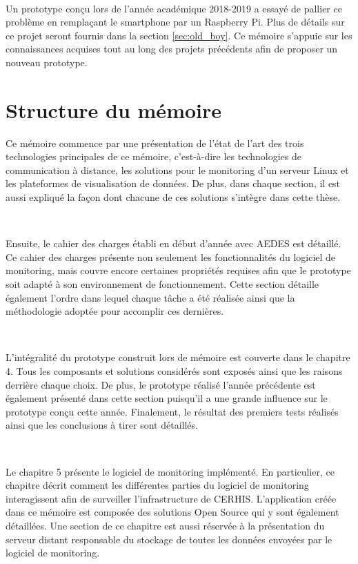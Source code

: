 ~

\noindent
Un prototype conçu lors de l'année académique 2018-2019 a essayé de pallier ce problème en remplaçant le smartphone par un Raspberry Pi. Plus de détails sur ce projet seront fournis dans la section \ref{sec:old_boy}. Ce mémoire s'appuie sur les connaissances acquises tout au long des projets précédents afin de proposer un nouveau prototype.


\section{Structure du mémoire}

\noindent
Ce mémoire commence par une présentation de l’état de l’art des trois technologies principales de ce mémoire, c’est-à-dire les technologies de communication à distance, les solutions pour le monitoring d’un serveur Linux et les plateformes de visualisation de données. De plus, dans chaque section, il est aussi expliqué la façon dont chacune de ces solutions s'intègre dans cette thèse.

~

\noindent
Ensuite, le cahier des charges établi en début d’année avec AEDES est détaillé. Ce cahier des charges présente non seulement les fonctionnalités du logiciel de monitoring, mais couvre encore certaines propriétés requises afin que le prototype soit adapté à son environnement de fonctionnement. Cette section détaille également l’ordre dans lequel chaque tâche a été réalisée ainsi que la méthodologie adoptée pour accomplir ces dernières.

~

\noindent
L’intégralité du prototype construit lors de mémoire est couverte dans le chapitre 4. Tous les composants et solutions considérés sont exposés ainsi que les raisons derrière chaque choix.  De plus, le prototype réalisé l’année précédente est également présenté dans cette section puisqu’il a une grande influence sur le prototype conçu cette année. Finalement, le résultat des premiers tests réalisés ainsi que les conclusions à tirer sont détaillés.

~

\noindent
Le chapitre 5 présente le logiciel de monitoring implémenté. En particulier, ce chapitre décrit comment les différentes parties du logiciel de monitoring interagissent afin de surveiller l’infrastructure de CERHIS. L’application créée dans ce mémoire est composée des solutions Open Source qui y sont également détaillées. Une section de ce chapitre est aussi réservée à la présentation du serveur distant responsable du stockage de toutes les données envoyées par le logiciel de monitoring.

